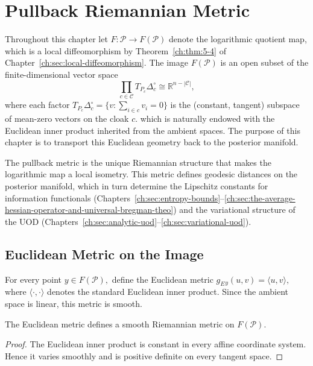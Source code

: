 \chapter[Pullback Metric]{Pullback Riemannian Metric}\label{ch:sec:pullback-riemannian-metric}
Throughout this chapter let $F:\mathcal P \longrightarrow F(\mathcal P)$ denote the logarithmic quotient map, which is a local diffeomorphism by Theorem~\ref{ch:thm:5-4} of Chapter~\ref{ch:sec:local-diffeomorphism}.
The image \(F(\mathcal P)\) is an open subset of the finite-dimensional vector space
\[
\prod_{c\in\mathcal C} T_{P_c}\Delta_c^\circ \cong \mathbb R^{n-|\mathcal C|},
\]
where each factor \(T_{P_c}\Delta_c^\circ=\{v:\sum_{i\in c}v_i=0\}\) is the
(constant, tangent) subspace of mean-zero vectors on the cloak \(c\).
which is naturally endowed with the Euclidean inner product inherited from the ambient spaces.
The purpose of this chapter is to transport this Euclidean geometry back to the posterior manifold.

The pullback metric is the unique Riemannian structure that makes the logarithmic map a local isometry. This metric defines geodesic distances on the posterior manifold, which in turn determine the Lipschitz constants for information functionals (Chapters~\ref{ch:sec:entropy-bounds}--\ref{ch:sec:the-average-hessian-operator-and-universal-bregman-theo}) and the variational structure of the UOD (Chapters~\ref{ch:sec:analytic-uod}--\ref{ch:sec:variational-uod}).

\section{Euclidean Metric on the Image}\label{ch:sec:euclidean-metric-on-the-image}
For every point
$y\in F(\mathcal P),$
define the Euclidean metric
$g_E{}_y(u,v)=\langle u,v\rangle,$
where \(\langle\cdot,\cdot\rangle\) denotes the standard Euclidean inner product.
Since the ambient space is linear, this metric is smooth.
\begin{proposition}
\label{ch:prop:7-1}
The Euclidean metric defines a smooth Riemannian metric on \(F(\mathcal P)\).
\end{proposition}
\begin{proof}
The Euclidean inner product is constant in every affine coordinate system. Hence it varies smoothly and is positive definite on every tangent space. 
\end{proof}

